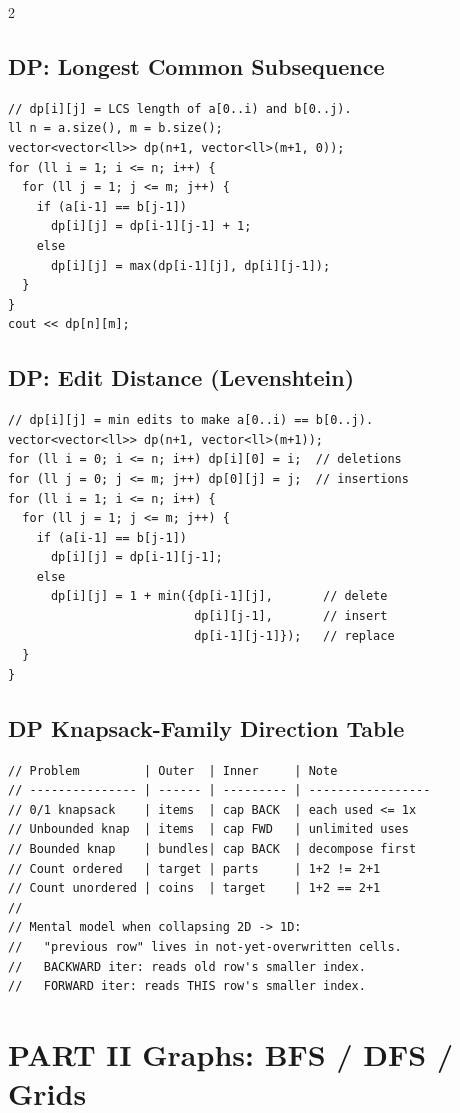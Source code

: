\documentclass[10pt,letterpaper]{extarticle}
\newenvironment{block}[1]
  {\subsection*{#1}\nopagebreak}
  {\par\addvspace{2pt}}
\begin{document}
\begin{multicols*}{2}
\begin{block}{DP: Longest Common Subsequence}
\begin{lstlisting}
// dp[i][j] = LCS length of a[0..i) and b[0..j).
ll n = a.size(), m = b.size();
vector<vector<ll>> dp(n+1, vector<ll>(m+1, 0));
for (ll i = 1; i <= n; i++) {
  for (ll j = 1; j <= m; j++) {
    if (a[i-1] == b[j-1])
      dp[i][j] = dp[i-1][j-1] + 1;
    else
      dp[i][j] = max(dp[i-1][j], dp[i][j-1]);
  }
}
cout << dp[n][m];
\end{lstlisting}
\end{block}

\begin{block}{DP: Edit Distance (Levenshtein)}
\begin{lstlisting}
// dp[i][j] = min edits to make a[0..i) == b[0..j).
vector<vector<ll>> dp(n+1, vector<ll>(m+1));
for (ll i = 0; i <= n; i++) dp[i][0] = i;  // deletions
for (ll j = 0; j <= m; j++) dp[0][j] = j;  // insertions
for (ll i = 1; i <= n; i++) {
  for (ll j = 1; j <= m; j++) {
    if (a[i-1] == b[j-1])
      dp[i][j] = dp[i-1][j-1];
    else
      dp[i][j] = 1 + min({dp[i-1][j],       // delete
                          dp[i][j-1],       // insert
                          dp[i-1][j-1]});   // replace
  }
}
\end{lstlisting}
\end{block}

\begin{block}{DP Knapsack-Family Direction Table}
\begin{lstlisting}
// Problem         | Outer  | Inner     | Note
// --------------- | ------ | --------- | -----------------
// 0/1 knapsack    | items  | cap BACK  | each used <= 1x
// Unbounded knap  | items  | cap FWD   | unlimited uses
// Bounded knap    | bundles| cap BACK  | decompose first
// Count ordered   | target | parts     | 1+2 != 2+1
// Count unordered | coins  | target    | 1+2 == 2+1
//
// Mental model when collapsing 2D -> 1D:
//   "previous row" lives in not-yet-overwritten cells.
//   BACKWARD iter: reads old row's smaller index.
//   FORWARD iter: reads THIS row's smaller index.
\end{lstlisting}
\end{block}


\section*{PART II \textemdash{} Graphs: BFS / DFS / Grids}


\end{multicols*}
\end{document}
